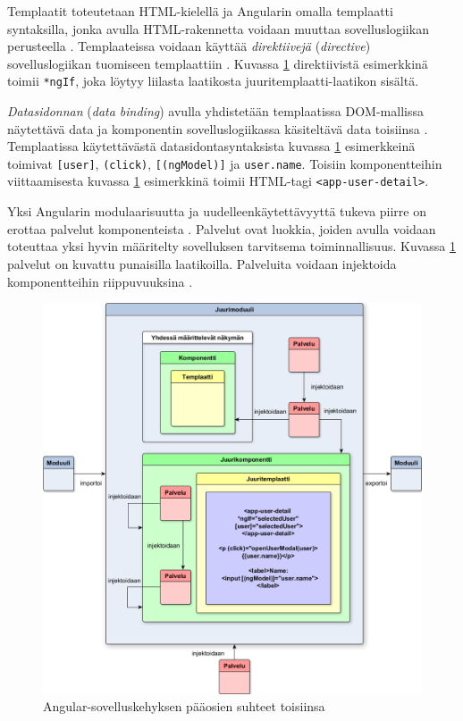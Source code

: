 \documentclass[finnish]{tktltiki2}
\theoremstyle{definition}
\theoremstyle{remark}
\numberwithin{figure}{section}
\begin{document}
Templaatit toteutetaan HTML-kielellä ja Angularin omalla templaatti syntaksilla, jonka avulla HTML-rakennetta voidaan muuttaa sovelluslogiikan perusteella \cite{ArchitectureComponents}. Templaateissa voidaan käyttää \textit{direktiivejä} (\textit{directive}) sovelluslogiikan tuomiseen templaattiin \cite{TemplateSyntax}. Kuvassa \ref{fig:AngularAppArchitectureOverview} direktiivistä esimerkkinä toimii \texttt{*ngIf}, joka löytyy liilasta laatikosta juuritemplaatti-laatikon sisältä. 

\textit{Datasidonnan} (\textit{data binding}) avulla yhdistetään templaatissa DOM-mallissa näytettävä data ja komponentin sovelluslogiikassa käsiteltävä data toisiinsa \cite{ArchitectureComponents}. Templaatissa käytettävästä datasidontasyntaksista kuvassa \ref{fig:AngularAppArchitectureOverview} esimerkkeinä toimivat \texttt{[user]}, \texttt{(click)}, \texttt{[(ngModel)]} ja \texttt{{{user.name}}}. Toisiin komponentteihin viittaamisesta kuvassa \ref{fig:AngularAppArchitectureOverview} esimerkkinä toimii HTML-tagi \texttt{<app-user-detail>}.

Yksi Angularin modulaarisuutta ja uudelleenkäytettävyyttä tukeva piirre on erottaa palvelut komponenteista \cite{ArchitectureServices}. Palvelut ovat luokkia, joiden avulla voidaan toteuttaa yksi hyvin määritelty sovelluksen tarvitsema toiminnallisuus. Kuvassa \ref{fig:AngularAppArchitectureOverview} palvelut on kuvattu punaisilla laatikoilla. Palveluita voidaan injektoida komponentteihin riippuvuuksina \cite{ArchitectureServices}. 


\begin{figure}[H]
  \centering
  \includegraphics[width=14cm]{images/AngularAppArchitectureOverview.png}
  \caption{Angular-sovelluskehyksen pääosien suhteet toisiinsa}
  \label{fig:AngularAppArchitectureOverview}
\end{figure}
\end{document}
